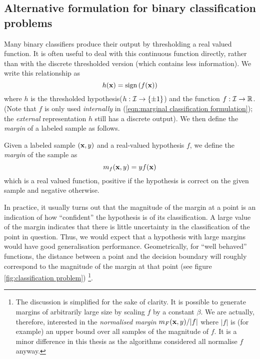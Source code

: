\subsection{Alternative formulation for binary classification problems}
\label{sec:margin formulation}

Many binary classifiers produce their output by thresholding a real
valued function.  It is often useful to deal with this continuous
function directly, rather than with the discrete thresholded version
(which contains less information).  We write this relationship as  
%
\begin{equation}
h(\mathbf{x}) = \mathrm{sign} \left( f(\mathbf{x}) \right)
\label{eqn:marginal classification formulation}
\end{equation}
%
where $h$ is the thresholded hypothesis($h : \mathcal{I} \rightarrow \{\pm
1\}$) and the function $f : \mathcal{I} \rightarrow \mathbb{R}$.  (Note that
$f$ is only used \emph{internally} in (\ref{eqn:marginal
classification formulation}); the \emph{external} representation $h$
still has a discrete output).  We then define the \emph{margin} of a
labeled sample as follows. 

\begin{definition}
Given a labeled sample $(\mathbf{x}, y)$ and a real-valued hypothesis
$f$, we define the \emph{margin} of the sample as
%
\begin{equation}
m_{f}(\mathbf{x},y) = y f(\mathbf{x})
\end{equation}
%
which is a real valued function, positive if the hypothesis is correct
on the given sample and negative otherwise.
\end{definition}

In practice, it usually turns out that the magnitude of the margin at
a point is an indication of how ``confident'' the hypothesis is
of its classification.  A large value of the margin indicates that
there is little uncertainty in the classification of the point in
question.  Thus, we would expect that a hypothesis with large margins
would have good generalisation performance.  Geometrically, for ``well
behaved'' functions, the distance between a point and the decision
boundary will roughly correspond to the magnitude of the margin at
that point (see figure \ref{fig:classification problem})%
\footnote{The discussion is simplified for the sake of clarity.
It is possible to generate margins of arbitrarily large size by
scaling $f$ by a constant $\beta$.  We are actually, therefore,
interested in the \emph{normalised margin} $m_F(\mathbf{x}, y)/|f|$ where
$|f|$ is (for example) an upper bound over all samples of the
magnitude of $f$.  It is a minor difference in this thesis as the
algorithms considered all normalise $f$ anyway.}.

